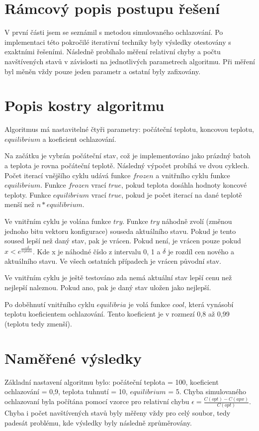 \documentclass[10pt,a4paper]{article}
\begin{document}
\section{Rámcový popis postupu řešení}
V první části jsem se seznámil s metodou simulovaného ochlazování. Po implementaci této pokročilé iterativní techniky byly výsledky otestovány s exaktními řešeními. Následně probíhalo měření relativní chyby a počtu navštívených stavů v závislosti na jednotlivých parametrech algoritmu. Při měření byl měněn vždy pouze jeden parametr a ostatní byly zafixovány.

\section{Popis kostry algoritmu}
Algoritmus má nastavitelné čtyři parametry: počáteční teplotu, koncovou teplotu, $equilibrium$ a koeficient ochlazování.

Na začátku je vybrán počáteční stav, což je implementováno jako prázdný batoh a teplota je rovna počáteční teplotě. Následný výpočet probíhá ve dvou cyklech. Počet iterací vnějšího cyklu udává funkce $frozen$ a vnitřního cyklu funkce $equilibrium$. Funkce $frozen$ vrací $true$, pokud teplota dosáhla hodnoty koncové teploty. Funkce $equilibrium$ vrací $true$, pokud je počet iterací na dané teplotě menší než $n * equilibrium$.

Ve vnitřním cyklu je volána funkce $try$. Funkce $try$ náhodně zvolí (změnou jednoho bitu vektoru konfigurace) souseda aktuálního stavu. Pokud je tento soused lepší než daný stav, pak je vrácen. Pokud není, je vrácen pouze pokud $ x < e^{\frac{-\delta}{teplota}}$. Kde x je náhodné číslo z intervalu 0, 1 a $\delta$ je rozdíl cen nového a aktuálního stavu. Ve všech ostatních případech je vrácen původní stav.

Ve vnitřním cyklu je ještě testováno zda nemá aktuální stav lepší cenu než nejlepší naleznou. Pokud ano, pak je daný stav uložen jako nejlepší.

Po doběhnutí vnitřního cyklu $equilibria$ je volá funkce $cool$, která vynásobí teplotu koeficientem ochlazování. Tento koeficient je v rozmezí 0,8 až 0,99 (teplotu tedy zmenší).

\section{Naměřené výsledky}
Základní nastavení algoritmu bylo: počáteční teplota = 100, koeficient ochlazování = 0,9, teplota tuhnutí = 10, $equilibrium$ = 5. Chyba simulovaného ochlazovaní byla počítána pomocí vzorce pro relativní chybu $\epsilon = \frac{C(opt) - C(apx)}{C(opt)}$. Chyba i počet navštívených stavů byly měřeny vždy pro celý soubor, tedy padesát problému, kde výsledky byly následně zprůměrovány.
\end{document}
